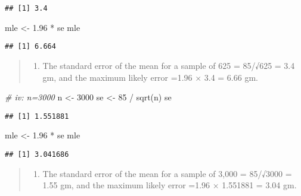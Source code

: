 \documentclass[
]{memoir}
\newenvironment{Shaded}{\begin{snugshade}}{\end{snugshade}}
\newcommand{\CommentTok}[1]{\textcolor[rgb]{0.56,0.35,0.01}{\textit{#1}}}
\newcommand{\DecValTok}[1]{\textcolor[rgb]{0.00,0.00,0.81}{#1}}
\newcommand{\FloatTok}[1]{\textcolor[rgb]{0.00,0.00,0.81}{#1}}
\newcommand{\FunctionTok}[1]{\textcolor[rgb]{0.00,0.00,0.00}{#1}}
\newcommand{\NormalTok}[1]{#1}
\newcommand{\OtherTok}[1]{\textcolor[rgb]{0.56,0.35,0.01}{#1}}
\newcommand{\SpecialCharTok}[1]{\textcolor[rgb]{0.00,0.00,0.00}{#1}}
\providecommand{\tightlist}{%
  \setlength{\itemsep}{0pt}\setlength{\parskip}{0pt}}
\begin{document}
\begin{verbatim}
## [1] 3.4
\end{verbatim}

\begin{Shaded}
\begin{Highlighting}[]
\NormalTok{mle }\OtherTok{\textless{}{-}} \FloatTok{1.96} \SpecialCharTok{*}\NormalTok{ se}
\NormalTok{mle}
\end{Highlighting}
\end{Shaded}

\begin{verbatim}
## [1] 6.664
\end{verbatim}

\begin{quote}
\begin{enumerate}
\def\labelenumi{\roman{enumi})}
\setcounter{enumi}{2}
\tightlist
\item
  The standard error of the mean for a sample of 625 = 85/√625 = 3.4 gm, and the maximum likely error =1.96 × 3.4 = 6.66 gm.
\end{enumerate}
\end{quote}

\begin{Shaded}
\begin{Highlighting}[]
\CommentTok{\# iv: n=3000}
\NormalTok{n }\OtherTok{\textless{}{-}} \DecValTok{3000}
\NormalTok{se }\OtherTok{\textless{}{-}} \DecValTok{85} \SpecialCharTok{/} \FunctionTok{sqrt}\NormalTok{(n)}
\NormalTok{se}
\end{Highlighting}
\end{Shaded}

\begin{verbatim}
## [1] 1.551881
\end{verbatim}

\begin{Shaded}
\begin{Highlighting}[]
\NormalTok{mle }\OtherTok{\textless{}{-}} \FloatTok{1.96} \SpecialCharTok{*}\NormalTok{ se}
\NormalTok{mle}
\end{Highlighting}
\end{Shaded}

\begin{verbatim}
## [1] 3.041686
\end{verbatim}

\begin{quote}
\begin{enumerate}
\def\labelenumi{\roman{enumi})}
\setcounter{enumi}{3}
\tightlist
\item
  The standard error of the mean for a sample of 3,000 = 85/√3000 = 1.55 gm, and the maximum likely error =1.96 × 1.551881 = 3.04 gm.
\end{enumerate}
\end{quote}
\end{document}
